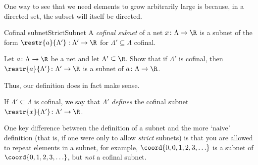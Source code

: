 One way to see that we need elements to grow arbitrarily large is because, in a directed set, the subset will itself be directed.
\begin{dfn}{Cofinal subnet}{StrictSubnet}
A \emph{cofinal subnet} of a net $x\colon \Lambda \rightarrow \R$ is a subnet of the form $\restr{a}{\Lambda '}:\Lambda '\rightarrow \R$ for $\Lambda '\subseteq \Lambda$ cofinal.
\begin{exr}[breakable=false]{}{}
Let $a\colon \Lambda \rightarrow \R$ be a net and let $\Lambda '\subseteq \R$.  Show that if $\Lambda '$ is cofinal, then $\restr{a}{\Lambda '}\colon \Lambda '\rightarrow \R$ is a subnet of $a\colon \Lambda \rightarrow \R$.
\begin{rmk}
Thus, our definition does in fact make sense.
\end{rmk}
\end{exr}
\begin{rmk}
If $\Lambda '\subseteq \Lambda$ is cofinal, we say that $\Lambda '$ \emph{defines} the cofinal subnet $\restr{x}{\Lambda '}\colon \Lambda '\rightarrow \R$.
\end{rmk}
\begin{rmk}
One key difference between the definition of a subnet and the more `naive' definition (that is, if one were only to allow \emph{strict} subnets) is that you are allowed to repeat elements in a subnet, for example, $\coord{0,0,1,2,3,\ldots}$ is a subnet of $\coord{0,1,2,3,\ldots}$, but \emph{not} a cofinal subnet.
\end{rmk}
\end{dfn}

